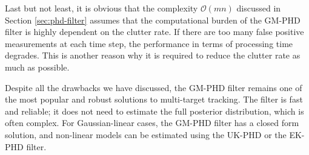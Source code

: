 Last but not least, it is obvious that the complexity $\mathcal{O}(mn)$ discussed in Section \ref{sec:phd-filter} assumes that the computational burden of the GM-PHD filter is highly dependent on the clutter rate. If there are too many false positive measurements at each time step, the performance in terms of processing time degrades. This is another reason why it is required to reduce the clutter rate as much as possible.

Despite all the drawbacks we have discussed, the GM-PHD filter remains one of the most popular and robust solutions to multi-target tracking. The filter is fast and reliable; it does not need to estimate the full posterior distribution, which is often complex. For Gaussian-linear cases, the GM-PHD filter has a closed form solution, and non-linear models can be estimated using the UK-PHD or the EK-PHD filter.
